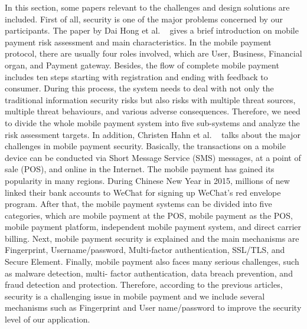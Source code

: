 \documentclass{sigchi}
\begin{document}
In this section, some papers relevant to the challenges and design solutions are included. First of all, security is one of the major problems concerned by our participants. The paper by Dai Hong et al. ~\cite{RA} gives a brief introduction on mobile payment risk assessment and main characteristics. In the mobile payment protocol, there are usually four roles involved, which are User, Business, Financial organ, and Payment gateway. Besides, the flow of complete mobile payment includes ten steps starting with registration and ending with feedback to consumer. During this process, the system needs to deal with not only the traditional information security risks but also risks with multiple threat sources, multiple threat behaviours, and various adverse consequences. Therefore, we need to divide the whole mobile payment system into five sub-systems and analyze the risk assessment targets. In addition, Christen Hahn et al. ~\cite{MP} talks about the major challenges in mobile payment security. Basically, the transactions on a mobile device can be conducted via Short Message Service (SMS) messages, at a point of sale (POS), and online in the Internet. The mobile payment has gained its popularity in many regions. During Chinese New Year in 2015, millions of new linked their bank accounts to WeChat for signing up WeChat's red envelope program. After that, the mobile payment systems can be divided into five categories, which are mobile payment at the POS, mobile payment as the POS, mobile payment platform, independent mobile payment system, and direct carrier billing. Next, mobile payment security is explained and the main mechanisms are Fingerprint, Username/password, Multi-factor authentication, SSL/TLS, and Secure Element. Finally, mobile payment also faces many serious challenges, such as malware detection, multi- factor authentication, data breach prevention, and fraud detection and protection. Therefore, according to the previous articles, security is a challenging issue in mobile payment and we include several mechanisms such as Fingerprint and User name/password to improve the security level of our application.
 
\end{document}

